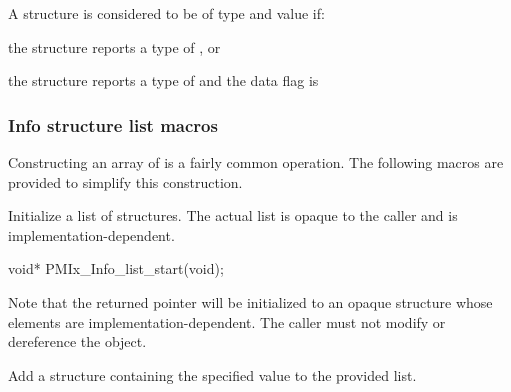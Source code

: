 
\begin{arglist}
\end{arglist}

A  structure is considered to be of type  and value  if:

\begin{compactitemize}
    \item the structure reports a type of , or
    \item the structure reports a type of  and the data flag is 
\end{compactitemize}

\subsubsection{Info structure list macros}
Constructing an array of  is a fairly common operation. The following macros are provided to simplify this construction.


\summary

Initialize a list of  structures. The actual list is opaque to the caller and is implementation-dependent.

\format

\cspecificstart
\begin{codepar}
void*
PMIx_Info_list_start(void);
\end{codepar}
\cspecificend

\descr

Note that the returned pointer will be initialized to an opaque structure whose elements are implementation-dependent. The caller must not modify or dereference the object.


\summary

Add a  structure containing the specified value to the provided list.

\format

